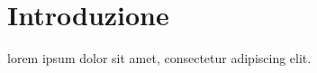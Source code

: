 \section{Introduzione} \label{sec:introduction}
lorem ipsum dolor sit amet, consectetur adipiscing elit.